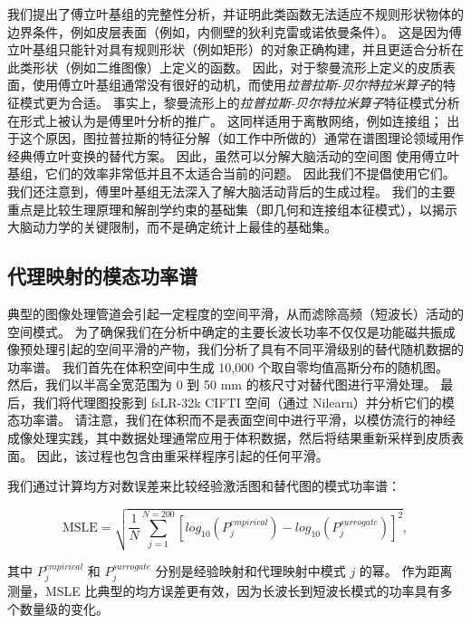 \documentclass[lang=cn,a4paper,newtx]{elegantpaper}
\begin{document}
我们提出了傅立叶基组的完整性分析，并证明此类函数无法适应不规则形状物体的边界条件，例如皮层表面（例如，内侧壁的狄利克雷或诺依曼条件）\cite{hasson2008hierarchy}。
这是因为傅立叶基组只能针对具有规则形状（例如矩形）的对象正确构建，并且更适合分析在此类形状（例如二维图像）上定义的函数。
因此，对于黎曼流形上定义的皮质表面，使用傅立叶基组通常没有很好的动机，而使用\textit{拉普拉斯-贝尔特拉米算子}的特征模式更为合适\cite{murray2014hierarchy,glasser2011mapping}。
事实上，黎曼流形上的\textit{拉普拉斯-贝尔特拉米算子}特征模式分析在形式上被认为是傅里叶分析\cite{gao2020neuronal}的推广。
这同样适用于离散网络，例如连接组；
出于这个原因，图拉普拉斯的特征分解（如工作中所做的）通常在谱图理论领域用作经典傅立叶变换的替代方案\cite{tian2020topographic}。
因此，虽然可以分解大脑活动的空间图 使用傅立叶基组，它们的效率非常低并且不太适合当前的问题。
因此我们不提倡使用它们。
我们还注意到，傅里叶基组无法深入了解大脑活动背后的生成过程。
我们的主要重点是比较生理原理和解剖学约束的基础集（即几何和连接组本征模式），以揭示大脑动力学的关键限制，而不是确定统计上最佳的基础集。





\subsection{代理映射的模态功率谱} \label{sec:modal_power_spectra}


典型的图像处理管道会引起一定程度的空间平滑，从而滤除高频（短波长）活动的空间模式。
为了确保我们在分析中确定的主要长波长功率不仅仅是功能磁共振成像预处理引起的空间平滑的产物，我们分析了具有不同平滑级别的替代随机数据的功率谱。
我们首先在体积空间中生成 10,000 个取自零均值高斯分布的随机图。
然后，我们以半高全宽范围为 0 到 50 mm 的核尺寸对替代图进行平滑处理。
最后，我们将代理图投影到 fsLR-32k CIFTI 空间（通过 Nilearn）并分析它们的模态功率谱。
请注意，我们在体积而不是表面空间中进行平滑，以模仿流行的神经成像处理实践，其中数据处理通常应用于体积数据，然后将结果重新采样到皮质表面\cite{haak2018connectopic}。
因此，该过程也包含由重采样程序引起的任何平滑。


我们通过计算均方对数误差来比较经验激活图和替代图的模式功率谱：

\begin{equation}\label{eq:MSLE}
	\text{MSLE} = \sqrt{
				\frac{1}{N}
					\sum_{j=1}^{N=200}
					[ log_10 (P_j^{empirical}) - 
					log_10 (P_j^{surrogate}) ] ^2
				},
\end{equation}

其中 $ P_j^{empirical} $ 和 $ P_j^{surrogate} $ 分别是经验映射和代理映射中模式 $ j $ 的幂。
作为距离测量，MSLE 比典型的均方误差更有效，因为长波长到短波长模式的功率具有多个数量级的变化。
\end{document}
